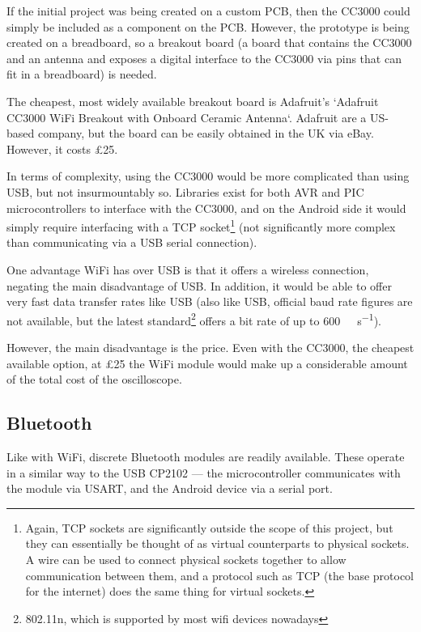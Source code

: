 If the initial project was being created on a custom PCB, then the CC3000 could
simply be included as a component on the PCB. However, the prototype is being
created on a breadboard, so a breakout board (a board that contains the CC3000
and an antenna and exposes a digital interface to the CC3000 via pins that can
fit in a breadboard) is needed.

The cheapest, most widely available breakout board is Adafruit's `Adafruit
CC3000 WiFi Breakout with Onboard Ceramic Antenna`. Adafruit are a US-based
company, but the board can be easily obtained in the UK via eBay. However, it
costs \pounds 25.

In terms of complexity, using the CC3000 would be more complicated than using
USB, but not insurmountably so. Libraries exist for both AVR and PIC
microcontrollers to interface with the CC3000, and on the Android side it would
simply require interfacing with a TCP socket\footnote{Again, TCP sockets are
significantly outside the scope of this project, but they can essentially be
thought of as virtual counterparts to physical sockets. A wire can be used to
connect physical sockets together to allow communication between them, and a
protocol such as TCP (the base protocol for the internet) does the same thing
for virtual sockets.} (not significantly more complex than communicating via a
USB serial connection).

One advantage WiFi has over USB is that it offers a wireless connection,
negating the main disadvantage of USB. In addition, it would be able to offer
very fast data transfer rates like USB (also like USB, official baud rate
figures are not available, but the latest standard\footnote{802.11n, which is
supported by most wifi devices nowadays} offers a bit rate of up to
\SI{600}{\mega\bit\per\second}).

However, the main disadvantage is the price. Even with the CC3000, the cheapest
available option, at \pounds 25 the WiFi module would make up a considerable
amount of the total cost of the oscilloscope.

\subsection*{Bluetooth}

Like with WiFi, discrete Bluetooth modules are readily available. These operate
in a similar way to the USB CP2102 --- the microcontroller communicates with the
module via USART, and the Android device via a serial port.

